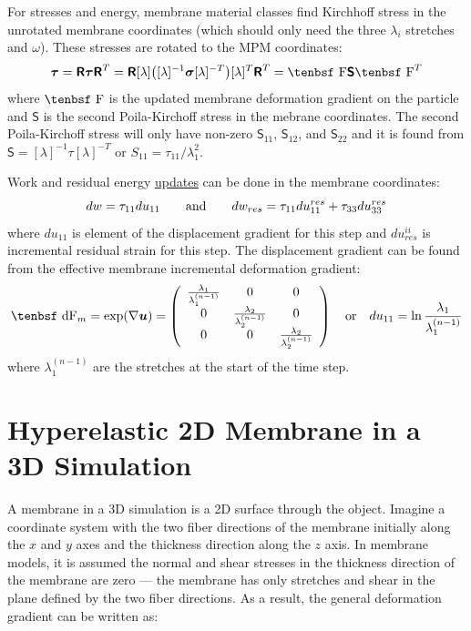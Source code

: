 \documentclass[11pt]{book}
\renewcommand{\vec}[1]{\boldsymbol{#1}}
\newcommand{\tens}[1]{\boldsymbol{\mathsf{#1}}}
\def\F{\hbox{\tenbsf F}}
\def\dF{\hbox{\tenbsf dF}}
\begin{document}
For stresses and energy, membrane material classes find Kirchhoff stress in the unrotated membrane coordinates (which should only need the three $\lambda_i$ stretches and $\omega$). These stresses are rotated to the MPM coordinates:
\begin{equation}
    \tens\tau =  \tens{R} \tens{\tau} \tens{R}^T =  \tens{R}[\lambda]\bigl([\lambda]^{-1} \tens{\sigma}[\lambda]^{-T}\bigr)[\lambda]^T\tens{R}^T =  \F \tens{S} \F^T
\end{equation}
where $\F$ is the updated membrane deformation gradient on the particle and $\tens{S}$ is the second Poila-Kirchoff stress in the mebrane coordinates. The second Poila-Kirchoff stress will only have non-zero $\tens{S}_{11}$, $\tens{S}_{12}$, and $\tens{S}_{22}$ and it is found from $\tens{S} =  [\lambda]^{-1} \tens{\tau}[\lambda]^{-T}$ or $S_{11} = \tau_{11}/\lambda_1^2$.

Work and residual energy \hyperref[EnergyUpdates]{updates} can be done in the membrane coordinates:
\begin{equation}
         dw = \tau_{11} du_{11} \qquad {\rm and}\qquad  dw_{res} = \tau_{11} du_{11}^{res} + \tau_{33} du_{33}^{res}
\end{equation}
where $du_{11}$ is element of the displacement gradient for this step and $du_{res}^{ii}$ is incremental residual strain for this step. The displacement gradient can be found from the effective membrane incremental deformation gradient:
\begin{equation}
      \dF_{m} = \exp(\nabla \vec u) = \left(\begin{array}{ccc} {\lambda_1\over \lambda_1^{(n-1)}} & 0 & 0 \\
                                                0 & {\lambda_2\over \lambda_2^{(n-1)}} & 0 \\
                                                 0 & 0 & {\lambda_2\over \lambda_2^{(n-1)}}
                 \end{array}\right)    \quad {\rm or}\quad  du_{11} =  \ln {\lambda_1\over \lambda_1^{(n-1)}}
\end{equation}
where $\lambda_1^{(n-1)}$ are the stretches at the start of the time step.

\section{Hyperelastic 2D Membrane in a 3D Simulation}

A membrane in a 3D simulation is a 2D surface through the object. Imagine a coordinate system with the two fiber directions of the membrane initially along the $x$ and $y$ axes and the thickness direction along the $z$ axis. In membrane models, it is assumed the normal and shear stresses in the thickness direction of the membrane are zero --- the membrane has only stretches and shear in the plane defined by the two fiber directions. As a result, the general deformation gradient can be written as:
\end{document}

